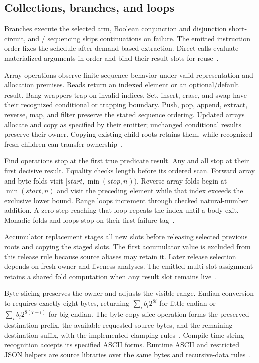 \documentclass[11pt]{article}
\newcommand{\code}[1]{\texttt{\seqsplit{#1}}}
\begin{document}
\subsection{Collections, branches, and loops}

Branches execute the selected arm, Boolean conjunction and disjunction short-circuit, and \code{Option}/\code{Except} sequencing skips continuations on failure.  The emitted instruction order fixes the schedule after demand-based extraction.  Direct calls evaluate materialized arguments in order and bind their result slots for reuse~\cite{extract,binary}.

Array operations observe finite-sequence behavior under valid representation and allocation premises.  Reads return an indexed element or an optional/default result.  Bang wrappers trap on invalid indices.  Set, insert, erase, and swap have their recognized conditional or trapping boundary.  Push, pop, append, extract, reverse, map, and filter preserve the stated sequence ordering.  Updated arrays allocate and copy as specified by their emitter; unchanged conditional results preserve their owner.  Copying existing child roots retains them, while recognized fresh children can transfer ownership~\cite{values,binary}.

Find operations stop at the first true predicate result.  Any and all stop at their first decisive result.  Equality checks length before its ordered scan.  Forward array and byte folds visit $[\mathit{start},\min(\mathit{stop},n))$.  Reverse array folds begin at $\min(\mathit{start},n)$ and visit the preceding element while that index exceeds the exclusive lower bound.  Range loops increment through checked natural-number addition.  A zero step reaching that loop repeats the index until a body exit.  Monadic folds and loops stop on their first failure tag~\cite{binary}.

Accumulator replacement stages all new slots before releasing selected previous roots and copying the staged slots.  The first accumulator value is excluded from this release rule because source aliases may retain it.  Later release selection depends on fresh-owner and liveness analyses.  The emitted multi-slot assignment retains a shared fold computation when any result slot remains live~\cite{values,binary}.

Byte slicing preserves the owner and adjusts the visible range.  Endian conversion to \code{UInt64} requires exactly eight bytes, returning $\sum_i b_i2^{8i}$ for little endian or $\sum_i b_i2^{8(7-i)}$ for big endian.  The byte-copy-slice operation forms the preserved destination prefix, the available requested source bytes, and the remaining destination suffix, with the implemented clamping rules~\cite{values,binary}.  Compile-time string recognition accepts its specified ASCII forms.  Runtime ASCII and restricted JSON helpers are source libraries over the same bytes and recursive-data rules~\cite{specification}.
\end{document}

